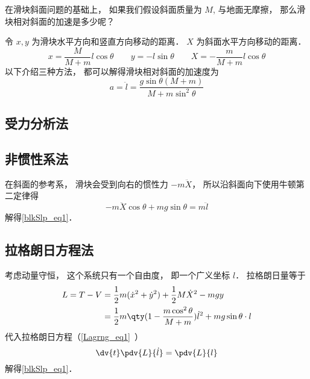 
\begin{issues}
\issueDraft
\end{issues}


在滑块斜面问题的基础上， 如果我们假设斜面质量为 $M$, 与地面无摩擦， 那么滑块相对斜面的加速是多少呢？

令 $x, y$ 为滑块水平方向和竖直方向移动的距离． $X$ 为斜面水平方向移动的距离．
\begin{equation}
x = \frac{M}{M + m}l\cos\theta
\qquad
y = -l\sin\theta
\qquad
X = -\frac{m}{M + m}l\cos\theta
\end{equation}
以下介绍三种方法， 都可以解得滑块相对斜面的加速度为
\begin{equation}\label{blkSlp_eq1}
a = \ddot l = \frac{g\sin\theta(M+m)}{M + m\sin^2\theta}
\end{equation}

\subsection{受力分析法}

\subsection{非惯性系法}
在斜面的参考系， 滑块会受到向右的惯性力 $-m\ddot X$， 所以沿斜面向下使用牛顿第二定律得
\begin{equation}
-m\ddot X\cos\theta + mg\sin\theta = m\ddot l
\end{equation}
解得\autoref{blkSlp_eq1}．

\subsection{拉格朗日方程法}
考虑动量守恒， 这个系统只有一个自由度， 即一个广义坐标 $l$． 拉格朗日量等于
\begin{equation}
\begin{aligned}
L = T - V &= \frac12 m(\dot x^2 + \dot y^2) + \frac12 M \dot X^2 - mgy\\
&= \frac{1}{2}m \qty(1 - \frac{m\cos^2\theta}{M + m}) \dot l^2 + mg\sin\theta \cdot l
\end{aligned}
\end{equation}
代入拉格朗日方程（\autoref{Lagrng_eq1}~）
\begin{equation}
\dv{t} \pdv{L}{\dot l} = \pdv{L}{l}
\end{equation}
解得\autoref{blkSlp_eq1}．
